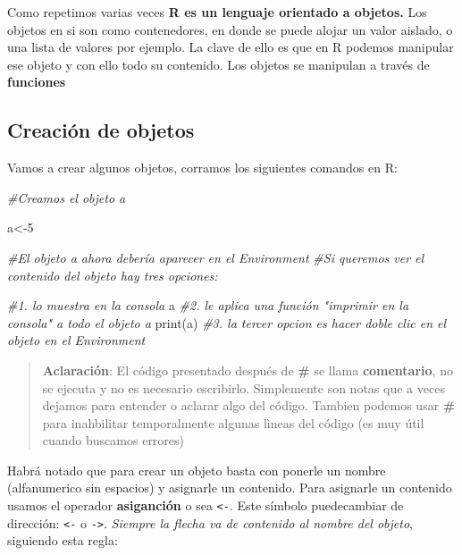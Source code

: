 \documentclass[
]{book}
\newenvironment{Shaded}{\begin{snugshade}}{\end{snugshade}}
\newcommand{\CommentTok}[1]{\textcolor[rgb]{0.56,0.35,0.01}{\textit{#1}}}
\newcommand{\DecValTok}[1]{\textcolor[rgb]{0.00,0.00,0.81}{#1}}
\newcommand{\FunctionTok}[1]{\textcolor[rgb]{0.00,0.00,0.00}{#1}}
\newcommand{\NormalTok}[1]{#1}
\newcommand{\OtherTok}[1]{\textcolor[rgb]{0.56,0.35,0.01}{#1}}
\begin{document}
Como repetimos varias veces \textbf{R es un lenguaje orientado a objetos.}
Los objetos en si son como contenedores, en donde se puede alojar un valor aislado, o una lista de valores por ejemplo.
La clave de ello es que en R podemos manipular ese objeto y con ello todo su contenido. Los objetos se manipulan a través de \textbf{funciones}

\hypertarget{creaciuxf3n-de-objetos}{%
\subsection{Creación de objetos}\label{creaciuxf3n-de-objetos}}

Vamos a crear algunos objetos, corramos los siguientes comandos en R:

\begin{Shaded}
\begin{Highlighting}[]
\CommentTok{\#Creamos el objeto a}

\NormalTok{a}\OtherTok{\textless{}{-}}\DecValTok{5}

\CommentTok{\#El objeto a ahora debería aparecer en el Environment}
\CommentTok{\#Si queremos ver el contenido del objeto hay tres opciones:}

\CommentTok{\#1. lo muestra en la consola}
\NormalTok{a }
\CommentTok{\#2. le aplica una función "imprimir en la consola" a todo el objeto a}
\FunctionTok{print}\NormalTok{(a) }
\CommentTok{\#3. la tercer opcion es hacer doble clic en el objeto en el Environment}
\end{Highlighting}
\end{Shaded}

\begin{quote}
\textbf{Aclaración}: El código presentado después de \textbf{\#} se llama \textbf{comentario}, no se ejecuta y no es necesario escribirlo. Simplemente son notas que a veces dejamos para entender o aclarar algo del código.
Tambien podemos usar \textbf{\#} para inahbilitar temporalmente algunas lìneas del código (es muy útil cuando buscamos errores)
\end{quote}

Habrá notado que para crear un objeto basta con ponerle un nombre (alfanumerico sin espacios) y asignarle un contenido. Para asignarle un contenido usamos el operador \textbf{asiganción} o sea \texttt{\textless{}-}. Este símbolo puedecambiar de dirección: \texttt{\textless{}-} o \texttt{-\textgreater{}}. \emph{Siempre la flecha va de contenido al nombre del objeto}, siguiendo esta regla:
\end{document}
